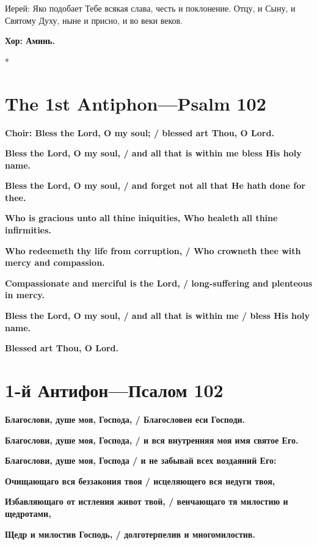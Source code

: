 \documentclass[12pt,a4paper,titlepage]{report}
\begin{document}
\begin{paracol}[1]{2}
  Иерей: Яко подобает Тебе всякая слава, честь и поклонение. Отцу, и Сыну, и Святому Духу, ныне и присно, и во веки веков.

  \textbf{Хор: Аминь.}

  \switchcolumn[0]*

  \section*{The 1st Antiphon---Psalm 102}
  \textbf{Choir: Bless the Lord, O my soul; / blessed art Thou, O Lord.}

  \textbf{Bless the Lord, O my soul, / and all that is within me bless His holy name.}

  \textbf{Bless the Lord, O my soul, / and forget not all that He hath done for thee.}

  \textbf{Who is gracious unto all thine iniquities, Who healeth all thine infirmities.}

  \textbf{Who redeemeth thy life from corruption, / Who crowneth thee with mercy and compassion.}

  \textbf{Compassionate and merciful is the Lord, / long-suffering and plenteous in mercy.}

  \textbf{Bless the Lord, O my soul, / and all that is within me / bless His holy name.}

  \textbf{Blessed art Thou, O Lord.}

  \switchcolumn[1]

  \section*{1-й Антифон---Псалом 102}
  \textbf{Благослови, душе моя, Господа, / Благословен еси Господи.}

  \textbf{Благослови, душе моя, Господа, / и вся внутренняя моя имя святое Его.}

  \textbf{Благослови, душе моя, Господа / и не забывай всех воздаяний Его:}

  \textbf{Очищающаго вся беззакония твоя / исцеляющего вся недуги твоя,}

  \textbf{Избавляющаго от истления живот твой, / венчающаго тя милостию и щедротами,}

  \textbf{Щедр и милостив Господь, / долготерпелив и многомилостив.}


\end{paracol}
\end{document}
